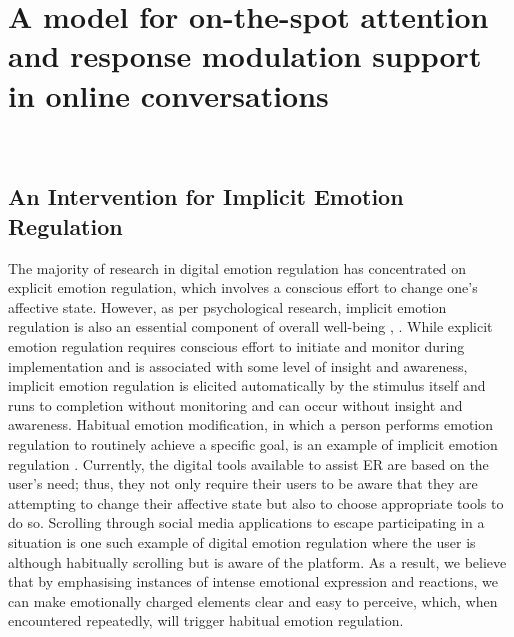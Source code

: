 \section{A model for on-the-spot attention and response modulation support in online conversations}~\label{sec:design}
\subsection{An Intervention for Implicit Emotion Regulation}
The majority of research in digital emotion regulation has concentrated on explicit emotion regulation, which involves a conscious effort to change one's affective state. However, as per psychological research, implicit emotion regulation is also an essential component of overall well-being \cite{gyurak2011explicit}, \cite{braunstein2017explicit}. While explicit emotion regulation requires conscious effort to initiate and monitor during implementation and is associated with some level of insight and awareness, implicit emotion regulation is elicited automatically by the stimulus itself and runs to completion without monitoring and can occur without insight and awareness. Habitual emotion modification, in which a person performs emotion regulation to routinely achieve a specific goal, is an example of implicit emotion regulation \cite{gross2006emotion}. 
Currently, the digital tools available to assist ER are based on the user's need; thus, they not only require their users to be aware that they are attempting to change their affective state but also to choose appropriate tools to do so. Scrolling through social media applications to escape participating in a situation is one such example of digital emotion regulation where the user is although habitually scrolling but is aware of the platform. As a result, we believe that by emphasising instances of intense emotional expression and reactions, we can make emotionally charged elements clear and easy to perceive, which, when encountered repeatedly, will trigger habitual emotion regulation.
